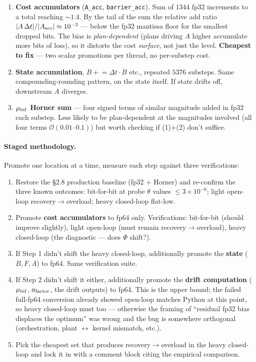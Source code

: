 \documentclass[11pt,a4paper]{article}
\begin{document}
\begin{enumerate}[itemsep=2pt,leftmargin=*]
\item \textbf{Cost accumulators} (\texttt{A\_acc}, \texttt{barrier\_acc}).
  Sum of $1344$ fp32 increments to a total reaching $\sim 1.4$. By the
  tail of the sum the relative add ratio
  $|A\,\Delta t|/|A_{\rm acc}| \approx 10^{-3}$ --- below the fp32
  mantissa floor for the smallest dropped bits. The bias is
  \emph{plan-dependent} (plans driving $A$ higher accumulate more
  bits of loss), so it distorts the cost \emph{surface}, not just the
  level. \textbf{Cheapest to fix} --- two scalar promotions per thread,
  no per-substep cost.
\item \textbf{State accumulation}, $B \mathrel{+}= \Delta t \cdot
  \dot B$ etc., repeated $5376$ substeps. Same compounding-rounding
  pattern, on the state itself. If state drifts off, downstream $A$
  diverges.
\item \textbf{$\mu_{\rm bif}$ Horner sum} --- four signed terms of
  similar magnitude added in fp32 each substep. Less likely to be
  plan-dependent at the magnitudes involved (all four terms
  $\mathcal O(0.01\text{--}0.1)$) but worth checking if (1)+(2) don't
  suffice.
\end{enumerate}

\paragraph{Staged methodology.}
Promote one location at a time, measure each step against three
verifications:

\begin{enumerate}[itemsep=2pt,leftmargin=*,label=\textbf{Step \arabic*.}]
\setcounter{enumi}{0}
\item Restore the \S2.8 production baseline (fp32 + Horner) and
  re-confirm the three known outcomes: bit-for-bit at probe
  $\theta$ values $\le 3\times 10^{-6}$; light open-loop
  recovery$\to$overload; heavy closed-loop flat-low.
\item Promote \textbf{cost accumulators} to fp64 only.
  Verifications: bit-for-bit (should improve slightly), light
  open-loop (must remain recovery$\to$overload), heavy closed-loop
  (the diagnostic --- does $\Phi$ shift?).
\item If Step 1 didn't shift the heavy closed-loop, additionally
  promote the \textbf{state} ($B, F, A$) to fp64. Same verification
  suite.
\item If Step 2 didn't shift it either, additionally promote the
  \textbf{drift computation} ($\mu_{\rm bif}$, $a_{\rm factor}$, the
  drift outputs) to fp64. This is the upper bound; the failed
  full-fp64 conversion already showed open-loop matches Python at
  this point, so heavy closed-loop must too --- otherwise the
  framing of ``residual fp32 bias displaces the optimum'' was wrong
  and the bug is somewhere orthogonal (orchestration, plant
  $\leftrightarrow$ kernel mismatch, etc.).
\item Pick the cheapest set that produces recovery$\to$overload in
  the heavy closed-loop and lock it in with a comment block citing
  the empirical comparison.
\end{enumerate}
\end{document}
